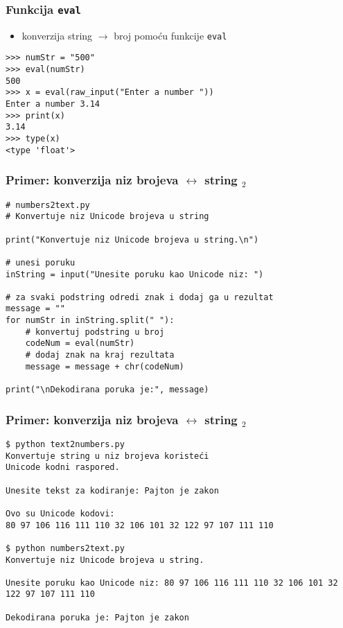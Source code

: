 \documentclass[utf8,compress,aspectratio=169]{beamer}
\begin{document}
\begin{frame}[fragile]
  \frametitle{Funkcija \texttt{eval}}
  \begin{itemize}
    \item konverzija string $\rightarrow$ broj pomoću funkcije \texttt{eval}
  \end{itemize}
\begin{verbatim}
>>> numStr = "500"
>>> eval(numStr)
500
>>> x = eval(raw_input("Enter a number "))
Enter a number 3.14
>>> print(x)
3.14
>>> type(x)
<type 'float'>
\end{verbatim}
\end{frame}

\begin{frame}[fragile,shrink=10]
  \frametitle{Primer: konverzija niz brojeva $\leftrightarrow$ string $_2$}
\begin{verbatim}
# numbers2text.py
# Konvertuje niz Unicode brojeva u string

print("Konvertuje niz Unicode brojeva u string.\n")

# unesi poruku
inString = input("Unesite poruku kao Unicode niz: ")

# za svaki podstring odredi znak i dodaj ga u rezultat
message = ""
for numStr in inString.split(" "):
    # konvertuj podstring u broj
    codeNum = eval(numStr)
    # dodaj znak na kraj rezultata
    message = message + chr(codeNum)

print("\nDekodirana poruka je:", message)
\end{verbatim}
\end{frame}

\begin{frame}[fragile,shrink=10]
  \frametitle{Primer: konverzija niz brojeva $\leftrightarrow$ string $_2$}
\begin{verbatim}
$ python text2numbers.py
Konvertuje string u niz brojeva koristeći
Unicode kodni raspored.

Unesite tekst za kodiranje: Pajton je zakon

Ovo su Unicode kodovi:
80 97 106 116 111 110 32 106 101 32 122 97 107 111 110

$ python numbers2text.py
Konvertuje niz Unicode brojeva u string.

Unesite poruku kao Unicode niz: 80 97 106 116 111 110 32 106 101 32 122 97 107 111 110

Dekodirana poruka je: Pajton je zakon
\end{verbatim}
\end{frame}
\end{document}
